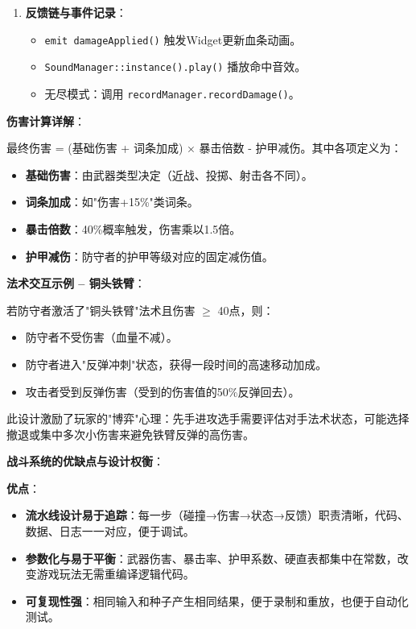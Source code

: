 ﻿\documentclass[utf8]{ctexart}
\begin{document}
\begin{enumerate}
  \item \textbf{反馈链与事件记录}：
  \begin{itemize}
    \item \texttt{emit damageApplied()} 触发Widget更新血条动画。
    \item \texttt{SoundManager::instance().play()} 播放命中音效。
    \item 无尽模式：调用 \texttt{recordManager.recordDamage()}。
  \end{itemize}
\end{enumerate}

\textbf{伤害计算详解}：

最终伤害 = (基础伤害 + 词条加成) × 暴击倍数 - 护甲减伤。其中各项定义为：

\begin{itemize}
  \item \textbf{基础伤害}：由武器类型决定（近战、投掷、射击各不同）。
  \item \textbf{词条加成}：如"伤害+15\%"类词条。
  \item \textbf{暴击倍数}：40\%概率触发，伤害乘以1.5倍。
  \item \textbf{护甲减伤}：防守者的护甲等级对应的固定减伤值。
\end{itemize}

\textbf{法术交互示例 -- 铜头铁臂}：

若防守者激活了"铜头铁臂"法术且伤害 $\geq$ 40点，则：

\begin{itemize}
  \item 防守者不受伤害（血量不减）。
  \item 防守者进入"反弹冲刺"状态，获得一段时间的高速移动加成。
  \item 攻击者受到反弹伤害（受到的伤害值的50\%反弹回去）。
\end{itemize}

此设计激励了玩家的"博弈"心理：先手进攻选手需要评估对手法术状态，可能选择撤退或集中多次小伤害来避免铁臂反弹的高伤害。

\textbf{战斗系统的优缺点与设计权衡}：

\textbf{优点}：
\begin{itemize}
  \item \textbf{流水线设计易于追踪}：每一步（碰撞→伤害→状态→反馈）职责清晰，代码、数据、日志一一对应，便于调试。
  \item \textbf{参数化与易于平衡}：武器伤害、暴击率、护甲系数、硬直表都集中在常数，改变游戏玩法无需重编译逻辑代码。
  \item \textbf{可复现性强}：相同输入和种子产生相同结果，便于录制和重放，也便于自动化测试。
\end{itemize}
\end{document}
